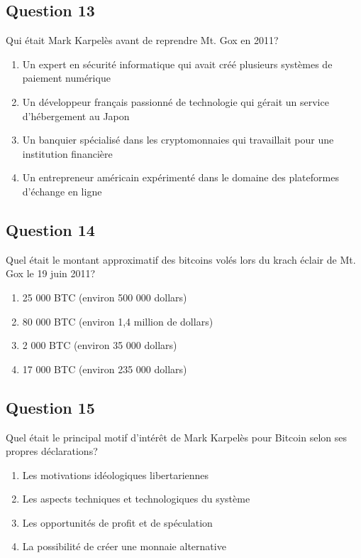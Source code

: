 \documentclass[12pt,a4paper]{article}
\begin{document}
\bigskip


\subsection*{Question 13}
Qui était Mark Karpelès avant de reprendre Mt. Gox en 2011?

\begin{enumerate}[label=\Alph*., leftmargin=*]
\item Un expert en sécurité informatique qui avait créé plusieurs systèmes de paiement numérique
\item Un développeur français passionné de technologie qui gérait un service d'hébergement au Japon
\item Un banquier spécialisé dans les cryptomonnaies qui travaillait pour une institution financière
\item Un entrepreneur américain expérimenté dans le domaine des plateformes d'échange en ligne
\end{enumerate}

\bigskip


\subsection*{Question 14}
Quel était le montant approximatif des bitcoins volés lors du krach éclair de Mt. Gox le 19 juin 2011?

\begin{enumerate}[label=\Alph*., leftmargin=*]
\item 25 000 BTC (environ 500 000 dollars)
\item 80 000 BTC (environ 1,4 million de dollars)
\item 2 000 BTC (environ 35 000 dollars)
\item 17 000 BTC (environ 235 000 dollars)
\end{enumerate}

\bigskip


\subsection*{Question 15}
Quel était le principal motif d'intérêt de Mark Karpelès pour Bitcoin selon ses propres déclarations?

\begin{enumerate}[label=\Alph*., leftmargin=*]
\item Les motivations idéologiques libertariennes
\item Les aspects techniques et technologiques du système
\item Les opportunités de profit et de spéculation
\item La possibilité de créer une monnaie alternative
\end{enumerate}
\end{document}
